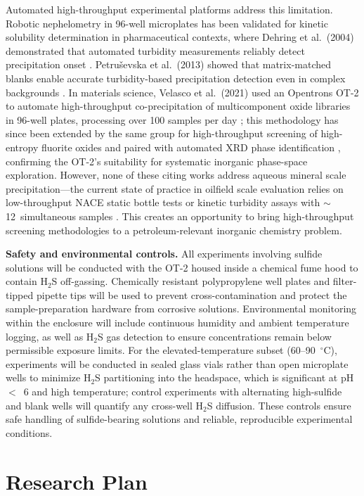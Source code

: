\documentclass[12pt]{article}
\begin{document}
Automated high-throughput experimental platforms address this limitation. Robotic nephelometry in 96-well microplates has been validated for kinetic solubility determination in pharmaceutical contexts, where Dehring et al.\ (2004) demonstrated that automated turbidity measurements reliably detect precipitation onset \cite{dehring2004}. Petru\v{s}evska et al.\ (2013) showed that matrix-matched blanks enable accurate turbidity-based precipitation detection even in complex backgrounds \cite{petrusevska2013}. In materials science, Velasco et al.\ (2021) used an Opentrons OT-2 to automate high-throughput co-precipitation of multicomponent oxide libraries in 96-well plates, processing over 100 samples per day \cite{velasco2021}; this methodology has since been extended by the same group for high-throughput screening of high-entropy fluorite oxides \cite{kumbhakar2023} and paired with automated XRD phase identification \cite{schuetzke2023}, confirming the OT-2's suitability for systematic inorganic phase-space exploration. However, none of these citing works address aqueous mineral scale precipitation---the current state of practice in oilfield scale evaluation relies on low-throughput NACE static bottle tests or kinetic turbidity assays with $\sim$12~simultaneous samples \cite{baugh2012}. This creates an opportunity to bring high-throughput screening methodologies to a petroleum-relevant inorganic chemistry problem.

\textbf{Safety and environmental controls.} All experiments involving sulfide solutions will be conducted with the OT-2 housed inside a chemical fume hood to contain H$_2$S off-gassing. Chemically resistant polypropylene well plates and filter-tipped pipette tips will be used to prevent cross-contamination and protect the sample-preparation hardware from corrosive solutions. Environmental monitoring within the enclosure will include continuous humidity and ambient temperature logging, as well as H$_2$S gas detection to ensure concentrations remain below permissible exposure limits. For the elevated-temperature subset (60--90~$^\circ$C), experiments will be conducted in sealed glass vials rather than open microplate wells to minimize H$_2$S partitioning into the headspace, which is significant at pH~$<$~6 and high temperature; control experiments with alternating high-sulfide and blank wells will quantify any cross-well H$_2$S diffusion. These controls ensure safe handling of sulfide-bearing solutions and reliable, reproducible experimental conditions.

\section{Research Plan}
\end{document}
